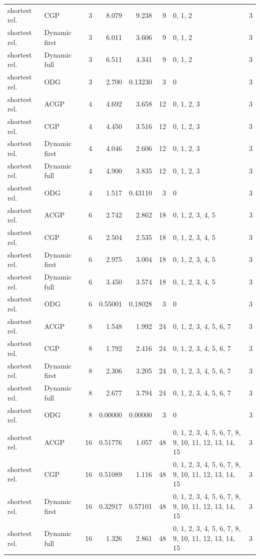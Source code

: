 \documentclass[10pt,a4paper]{article}
\begin{document}
\begin{longtable}{@{}p{23mm}p{29mm}rrrrp{36mm}r@{}}
shortest rel. & CGP & 3 & 8.079 & 9.238 & 9 & 0, 1, 2 & 3 \\
shortest rel. & Dynamic first & 3 & 6.011 & 3.606 & 9 & 0, 1, 2 & 3 \\
shortest rel. & Dynamic full & 3 & 6.511 & 4.341 & 9 & 0, 1, 2 & 3 \\
shortest rel. & ODG & 3 & 2.700 & 0.13230 & 3 & 0 & 3 \\
shortest rel. & ACGP & 4 & 4.692 & 3.658 & 12 & 0, 1, 2, 3 & 3 \\
shortest rel. & CGP & 4 & 4.450 & 3.516 & 12 & 0, 1, 2, 3 & 3 \\
shortest rel. & Dynamic first & 4 & 4.046 & 2.606 & 12 & 0, 1, 2, 3 & 3 \\
shortest rel. & Dynamic full & 4 & 4.900 & 3.835 & 12 & 0, 1, 2, 3 & 3 \\
shortest rel. & ODG & 4 & 1.517 & 0.43110 & 3 & 0 & 3 \\
shortest rel. & ACGP & 6 & 2.742 & 2.862 & 18 & 0, 1, 2, 3, 4, 5 & 3 \\
shortest rel. & CGP & 6 & 2.504 & 2.535 & 18 & 0, 1, 2, 3, 4, 5 & 3 \\
shortest rel. & Dynamic first & 6 & 2.975 & 3.004 & 18 & 0, 1, 2, 3, 4, 5 & 3 \\
shortest rel. & Dynamic full & 6 & 3.450 & 3.574 & 18 & 0, 1, 2, 3, 4, 5 & 3 \\
shortest rel. & ODG & 6 & 0.55001 & 0.18028 & 3 & 0 & 3 \\
shortest rel. & ACGP & 8 & 1.548 & 1.992 & 24 & 0, 1, 2, 3, 4, 5, 6, 7 & 3 \\
shortest rel. & CGP & 8 & 1.792 & 2.416 & 24 & 0, 1, 2, 3, 4, 5, 6, 7 & 3 \\
shortest rel. & Dynamic first & 8 & 2.306 & 3.205 & 24 & 0, 1, 2, 3, 4, 5, 6, 7 & 3 \\
shortest rel. & Dynamic full & 8 & 2.677 & 3.794 & 24 & 0, 1, 2, 3, 4, 5, 6, 7 & 3 \\
shortest rel. & ODG & 8 & 0.00000 & 0.00000 & 3 & 0 & 3 \\
shortest rel. & ACGP & 16 & 0.51776 & 1.057 & 48 & 0, 1, 2, 3, 4, 5, 6, 7, 8, 9, 10, 11, 12, 13, 14, 15 & 3 \\
shortest rel. & CGP & 16 & 0.51089 & 1.116 & 48 & 0, 1, 2, 3, 4, 5, 6, 7, 8, 9, 10, 11, 12, 13, 14, 15 & 3 \\
shortest rel. & Dynamic first & 16 & 0.32917 & 0.57101 & 48 & 0, 1, 2, 3, 4, 5, 6, 7, 8, 9, 10, 11, 12, 13, 14, 15 & 3 \\
shortest rel. & Dynamic full & 16 & 1.326 & 2.861 & 48 & 0, 1, 2, 3, 4, 5, 6, 7, 8, 9, 10, 11, 12, 13, 14, 15 & 3 \\

\end{longtable}
\end{document}
